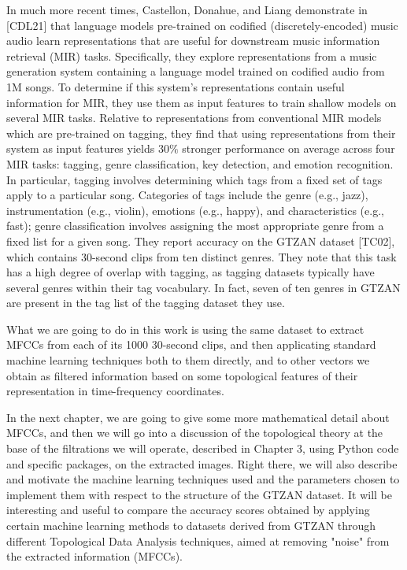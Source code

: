 \documentclass[english, LaM, oneside, noexaminfo]{sapthesis}
\begin{document}
In much more recent times, Castellon, Donahue, and Liang demonstrate in  [CDL21]  that language models pre-trained on codified (discretely-encoded) music audio learn representations that are useful for downstream music information retrieval (MIR) tasks. Specifically, they explore representations from a music generation system containing a language model trained on codified audio from 1M songs. To determine if this system’s representations contain useful information for MIR, they use them as input features to train shallow models on several MIR tasks. Relative to representations from conventional MIR models which are pre-trained on tagging, they find that using representations from their system as input features yields $30 \%$ stronger performance on average across four MIR tasks: tagging, genre classification, key detection, and emotion recognition. In particular, tagging involves determining which tags from a fixed set of tags apply to a particular song. Categories of tags include the genre (e.g., jazz), instrumentation (e.g., violin), emotions (e.g., happy), and characteristics (e.g., fast); genre classification involves assigning the most appropriate genre from a fixed list for a given song. They report accuracy on the GTZAN dataset [TC02], which contains 30-second clips from ten distinct genres. They note that this task has a high degree of overlap with tagging, as tagging datasets typically have several genres within their tag vocabulary. In fact, seven of ten genres in GTZAN are present in the tag list of the tagging dataset they use.

What we are going to do in this work is using the same dataset to extract MFCCs from each of its 1000 30-second clips, and then applicating standard machine learning techniques both to them directly, and to other vectors we obtain as filtered information based on some topological features of their representation in time-frequency coordinates. 

In the next chapter, we are going to give some more mathematical detail about MFCCs,  and then we will go into a discussion of the topological theory at the base of the filtrations we will operate, described in Chapter 3, using Python code and specific packages, on the extracted images. Right there, we will also describe and motivate the machine learning techniques used and the parameters chosen to implement them with respect to the structure of the GTZAN dataset.
It will be interesting and useful to compare the accuracy scores obtained by applying certain machine learning methods to datasets derived from GTZAN through different Topological Data Analysis techniques, aimed at removing "noise" from the extracted information (MFCCs).
\end{document}
